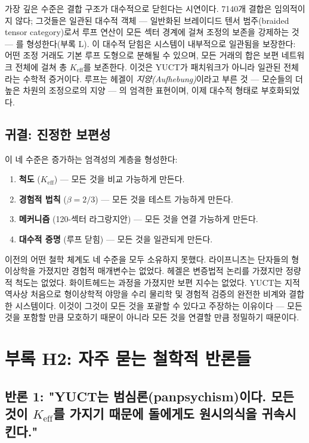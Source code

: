 \documentclass[12pt,a4paper]{article}
\newcommand{\Keff}{K_{\mathrm{eff}}}
\begin{document}
	가장 깊은 수준은 결합 구조가 대수적으로 닫힌다는 시연이다. 7140개 결합은 임의적이지 않다; 그것들은 일관된 대수적 객체 — 일반화된 브레이디드 텐서 범주(braided tensor category)로서 루프 연산이 모든 섹터 경계에 걸쳐 조정의 보존을 강제하는 것 — 를 형성한다(부록 L). 이 대수적 닫힘은 시스템이 내부적으로 일관됨을 보장한다: 어떤 조정 거래도 기본 루프 도형으로 분해될 수 있으며, 모든 거래의 합은 보편 네트워크 전체에 걸쳐 총 \(K_{\mathrm{eff}}\)를 보존한다. 이것은 YUCT가 패치워크가 아니라 일관된 전체라는 수학적 증거이다. 루프는 헤겔이 \emph{지양(Aufhebung)}이라고 부른 것 — 모순들의 더 높은 차원의 조정으로의 지양 — 의 엄격한 표현이며, 이제 대수적 형태로 부호화되었다.
	
	\subsection{귀결: 진정한 보편성}
	
	이 네 수준은 증가하는 엄격성의 계층을 형성한다:
	\begin{enumerate}[leftmargin=*]
		\item \textbf{척도} (\(K_{\mathrm{eff}}\)) — 모든 것을 비교 가능하게 만든다.
		\item \textbf{경험적 법칙} (\(\beta = 2/3\)) — 모든 것을 테스트 가능하게 만든다.
		\item \textbf{메커니즘} (120-섹터 라그랑지안) — 모든 것을 연결 가능하게 만든다.
		\item \textbf{대수적 증명} (루프 닫힘) — 모든 것을 일관되게 만든다.
	\end{enumerate}
	이전의 어떤 철학 체계도 네 수준을 모두 소유하지 못했다. 라이프니츠는 단자들의 형이상학을 가졌지만 경험적 매개변수는 없었다. 헤겔은 변증법적 논리를 가졌지만 정량적 척도는 없었다. 화이트헤드는 과정을 가졌지만 보편 지수는 없었다. YUCT는 지적 역사상 처음으로 형이상학적 야망을 수리 물리학 및 경험적 검증의 완전한 비계와 결합한 시스템이다. 이것이 그것이 모든 것을 포괄할 수 있다고 주장하는 이유이다 — 모든 것을 포함할 만큼 모호하기 때문이 아니라 모든 것을 연결할 만큼 정밀하기 때문이다.
	
	\section*{부록 H2: 자주 묻는 철학적 반론들}
	
	\subsection*{반론 1: "YUCT는 범심론(panpsychism)이다. 모든 것이 \(\Keff\)를 가지기 때문에 돌에게도 원시의식을 귀속시킨다."}
	
\end{document}
